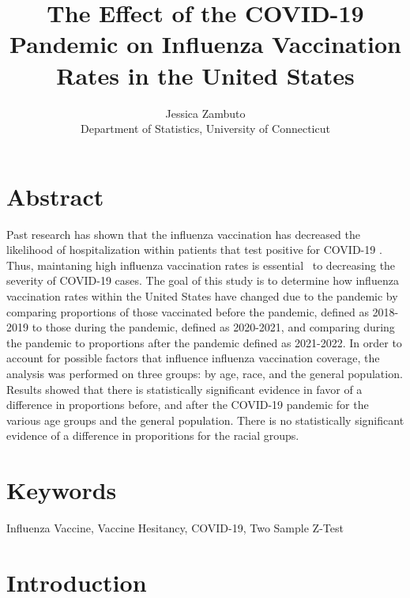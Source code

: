 \documentclass[12pt]{article}
\title{The Effect of the COVID-19 Pandemic on Influenza Vaccination Rates in the United States}
\author{Jessica Zambuto\\
Department of Statistics, University of Connecticut}
\begin{document}
\maketitle
\section*{Abstract}
\label{sec:Abstract}
Past research has shown that the influenza vaccination has decreased the likelihood of hospitalization within patients
that test positive for COVID-19 \citep{conlon2021impact}. Thus, maintaning high influenza vaccination rates is essential \
to decreasing the severity of COVID-19 cases. The goal of this study is to determine how influenza vaccination rates within the
United States have changed due to the pandemic by comparing proportions of those vaccinated before the pandemic, defined as 2018-2019
to those during the pandemic, defined as 2020-2021, and comparing during the pandemic to proportions after the pandemic defined as 2021-2022. 
In order to account for possible factors that influence influenza vaccination coverage, the analysis was performed on three groups: by age,
race, and the general population. Results showed that there is statistically significant evidence in favor of a difference in proportions before,
and after the COVID-19 pandemic for the various age groups and the general population. There is no statistically significant evidence of a difference
in proporitions for the racial groups.

\section*{Keywords}
\label{sec:Keywords}
Influenza Vaccine, Vaccine Hesitancy, COVID-19, Two Sample Z-Test

\section{Introduction}
\label{sec:Introduction}
\end{document}
